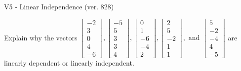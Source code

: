 \begin{exercise}
  \begin{exerciseTitle}V5 - Linear Independence (ver. 828)\end{exerciseTitle}
  \begin{exerciseStatement}
    Explain why the vectors \(\left[\begin{array}{r}
-2 \\
3 \\
0 \\
4 \\
-6
\end{array}\right] , \left[\begin{array}{r}
-5 \\
5 \\
3 \\
3 \\
4
\end{array}\right] , \left[\begin{array}{r}
0 \\
1 \\
-6 \\
-4 \\
2
\end{array}\right] , \left[\begin{array}{r}
2 \\
5 \\
-2 \\
1 \\
1
\end{array}\right] , \text{ and } \left[\begin{array}{r}
5 \\
-2 \\
-4 \\
4 \\
-5
\end{array}\right]\) are linearly dependent or linearly independent.	



\end{exerciseStatement}
\end{exercise}
